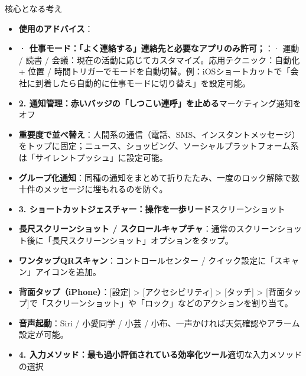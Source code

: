
核心となる考え


\begin{itemize}
  \item \textbf{使用のアドバイス}：
  \item \textbf{· 仕事モード：「よく連絡する」連絡先と必要なアプリのみ許可；}：\newline · 運動 / 読書 / 会議：現在の活動に応じてカスタマイズ。\newline 応用テクニック\newline ：自動化 + 位置 / 時間トリガーでモードを自動切替。例：iOSショートカットで「会社に到着したら自動的に仕事モードに切り替え」を設定可能。
  \item \textbf{2. 通知管理：赤いバッジの「しつこい連呼」を止める}マーケティング通知をオフ
\end{itemize}


\begin{itemize}
  \item \textbf{重要度で並べ替え}：人間系の通信（電話、SMS、インスタントメッセージ）をトップに固定；ニュース、ショッピング、ソーシャルプラットフォーム系は「サイレントプッシュ」に設定可能。
  \item \textbf{グループ化通知}：同種の通知をまとめて折りたたみ、一度のロック解除で数十件のメッセージに埋もれるのを防ぐ。
  \item \textbf{3. ショートカットジェスチャー：操作を一歩リード}スクリーンショット
\end{itemize}


\begin{itemize}
  \item \textbf{長尺スクリーンショット / スクロールキャプチャ}：通常のスクリーンショット後に「長尺スクリーンショット」オプションをタップ。
  \item \textbf{ワンタップQRスキャン}：コントロールセンター / クイック設定に「スキャン」アイコンを追加。
  \item \textbf{背面タップ（iPhone）}：[設定] > [アクセシビリティ] > [タッチ] > [背面タップ]で「スクリーンショット」や「ロック」などのアクションを割り当て。
  \item \textbf{音声起動}：Siri / 小愛同学 / 小芸 / 小布、一声かければ天気確認やアラーム設定が可能。
  \item \textbf{4. 入力メソッド：最も過小評価されている効率化ツール}適切な入力メソッドの選択
\end{itemize}

